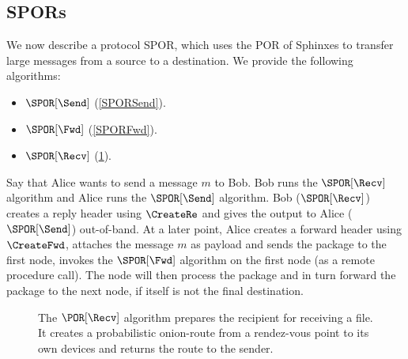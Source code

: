 
\subsection{\Acfp*{SPOR}}%
\label{sec:message_passing}


We now describe a protocol \ac{SPOR}, which uses the \ac{POR} of Sphinxes to 
transfer large messages from a source to a destination.
We provide the following algorithms:
\begin{itemize}
  \item \(\SPOR[\Send]\) (\cref{SPORSend}).
  \item \(\SPOR[\Fwd]\) (\cref{SPORFwd}).
  \item \(\SPOR[\Recv]\) (\cref{SPORRecv}).
\end{itemize}

Say that Alice wants to send a message \(m\) to Bob.
Bob runs the \(\SPOR[\Recv]\) algorithm and Alice runs the \(\SPOR[\Send]\) 
algorithm.
Bob (\ie \(\SPOR[\Recv]\)) creates a reply header using \(\CreateRe\) and gives 
the output to Alice (\ie \(\SPOR[\Send]\)) out-of-band.
At a later point, Alice creates a forward header using \(\CreateFwd\), attaches 
the message \(m\) as payload and sends the package to the first node, \ie 
invokes the \(\SPOR[\Fwd]\) algorithm on the first node (\eg as a remote 
procedure call).
The node will then process the package and in turn forward the package to the 
next node, if itself is not the final destination.


\begin{figure}
  \caption{\label{SPORRecv}%
    The \(\POR[\Recv]\) algorithm prepares the recipient for receiving a file.
    It creates a probabilistic onion-route from a rendez-vous point to its own 
    devices and returns the route to the sender.
  }
\end{figure}

